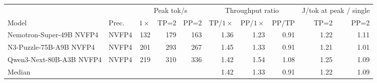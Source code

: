 \begin{tabular}{l l r r r r r r r r}
\toprule
 & & \multicolumn{3}{c}{Peak tok/s} & \multicolumn{3}{c}{Throughput ratio} & \multicolumn{2}{c}{J/tok at peak / single} \\
\cmidrule(lr){3-5}\cmidrule(lr){6-8}\cmidrule(lr){9-10}
Model & Prec. & $1\times$ & TP=2 & PP=2 & TP/$1\times$ & PP/$1\times$ & PP/TP & TP=2 & PP=2 \\
\midrule
Nemotron-Super-49B NVFP4 & NVFP4 & 132 & 179 & 163 & 1.36 & 1.23 & 0.91 & 1.22 & 1.11 \\
N3-Puzzle-75B-A9B NVFP4 & NVFP4 & 201 & 293 & 267 & 1.45 & 1.33 & 0.91 & 1.21 & 1.01 \\
Qwen3-Next-80B-A3B NVFP4 & NVFP4 & 219 & 310 & 336 & 1.42 & 1.54 & 1.08 & 1.25 & 1.09 \\
\midrule
Median &  &  &  &  & 1.42 & 1.33 & 0.91 & 1.22 & 1.09 \\
\bottomrule
\end{tabular}

